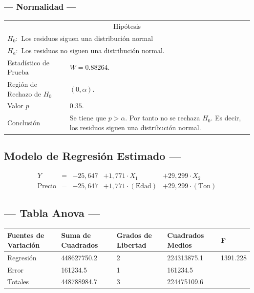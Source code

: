 \subsubsection{--- Normalidad ---} %
\begin{center}
  \begin{tabular}{|l|p{8cm}|}
    \cline{1-2}
    \multicolumn{2}{|c|}{Hipótesis}\\ \cline{1-2}
    \multicolumn{2}{|l|}{\(H_0:\) Los residuos siguen una distribución normal} \\ 
    \multicolumn{2}{|l|}{\(H_a:\) Los residuos no siguen una distribución normal.} \\ \cline{1-2}
    Estadístico de Prueba & \(W = 0.88264\).\\ \cline{1-2} 
		Región de Rechazo de \(H_0\) & \((0, \alpha )\).\\ \cline{1-2} 
    Valor \(p\) & \(0.35\).\\ \cline{1-2} 
    Conclusión & Se tiene que \(p> \alpha\). \newline 
		Por tanto no se rechaza \(H_0\). \newline 
		Es decir, los residuos siguen una distribución normal.\\ \cline{1-2} 
  \end{tabular}
\end{center}


\subsection{\centering Modelo de Regresión Estimado ---} %
\begin{align}
	Y & = &              -25,647 & + 1,771 \cdot X_1           & + 29,299   \cdot X_2   \\[2mm]
	\mbox{Precio} & = &  -25,647 & + 1,771 \cdot (\mbox{Edad}) & + 29,299   \cdot (\mbox{Ton})
	\label{eq:2}
\end{align}

\subsection{\centering --- Tabla Anova ---} %
\begin{center}
  \begin{tabular}{|l|l|l|l|l|}
    \hline 
    Fuentes de Variación  & Suma de Cuadrados & Grados de Libertad & Cuadrados Medios & F\\ \hline 
Regresión  &  448627750.2         &  2     & 224313875.1 &1391.228 \\ \hline
Error      &     161234.5         &  1     &    161234.5 &  \\ \hline
Totales    &  448788984.7         &  3     & 224475109.6 &  \\ \hline
  \end{tabular}
\end{center} 

